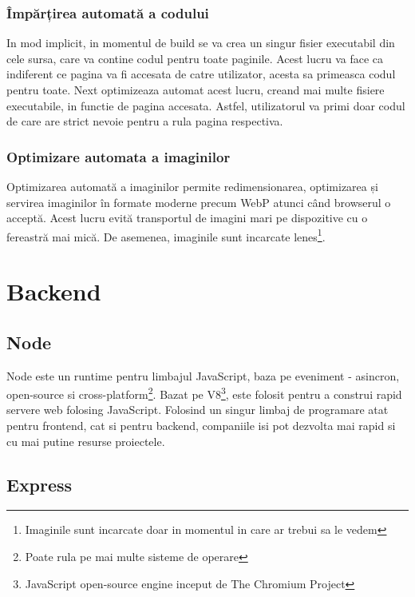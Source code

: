 \documentclass[12pt, a4paper, oneside, romanian]{teza-upb}
\begin{document}
\subsubsection{Împărțirea automată a codului}

In mod implicit, in momentul de build se va crea un singur fisier executabil din cele sursa, care va contine codul pentru toate paginile. Acest lucru va face ca indiferent ce pagina va fi accesata de catre utilizator, acesta sa primeasca codul pentru toate. Next optimizeaza automat acest lucru, creand mai multe fisiere executabile, in functie de pagina accesata. Astfel, utilizatorul va primi doar codul de care are strict nevoie pentru a rula pagina respectiva.

\subsubsection{Optimizare automata a imaginilor}

Optimizarea automată a imaginilor permite redimensionarea, optimizarea și servirea imaginilor în formate moderne precum WebP atunci când browserul o acceptă. Acest lucru evită transportul de imagini mari pe dispozitive cu o fereastră mai mică. De asemenea, imaginile sunt incarcate lenes\footnote{Imaginile sunt incarcate doar in momentul in care ar trebui sa le vedem}.\cite{nextimageoptimization}

\section{Backend}

\subsection{Node}

Node este un runtime pentru limbajul JavaScript, baza pe eveniment - asincron, open-source si cross-platform\footnote{Poate rula pe mai multe sisteme de operare}. Bazat pe V8\footnote{JavaScript open-source engine inceput de The Chromium Project}, este folosit pentru a construi rapid servere web folosing JavaScript. Folosind un singur limbaj de programare atat pentru frontend, cat si pentru backend, companiile isi pot dezvolta mai rapid si cu mai putine resurse proiectele.

\subsection{Express}
\end{document}
